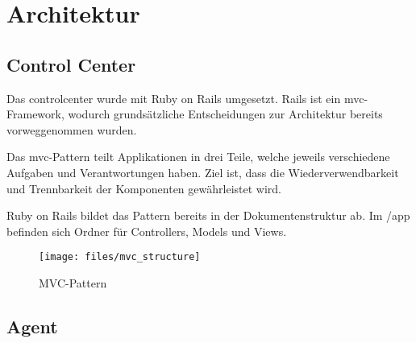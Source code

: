 \begin{comment}
Mit begründeten Architekturentscheidungen, Mit Diskussion, wie Q-Attribute sichergestellt wurden (welche Qualität wurde erreicht?), Mit Dokumentation, welche Tests durchgeführt wurden, welche Lösungsoptionen wurde aufgrund von Tests/Experimenten verworfen.
\end{comment}

\section{Architektur}

\xxx

\subsection*{Control Center}

Das \gls{controlcenter} wurde mit Ruby on Rails umgesetzt. Rails ist ein \gls{mvc}-Framework, wodurch grundsätzliche Entscheidungen zur Architektur bereits vorweggenommen wurden.

Das \gls{mvc}-Pattern teilt Applikationen in drei Teile, welche jeweils verschiedene Aufgaben und Verantwortungen haben. Ziel ist, dass die Wiederverwendbarkeit und Trennbarkeit der Komponenten gewährleistet wird.

Ruby on Rails bildet das Pattern bereits in der Dokumentenstruktur ab. Im /app befinden sich Ordner für Controllers, Models und Views.

\begin{figure}[H]
	\centering
	\texttt{[image: files/mvc\_structure]}
	\caption{MVC-Pattern}
	\label{fig:tec:mvc}
\end{figure}

\subsection*{Agent}

\xxx